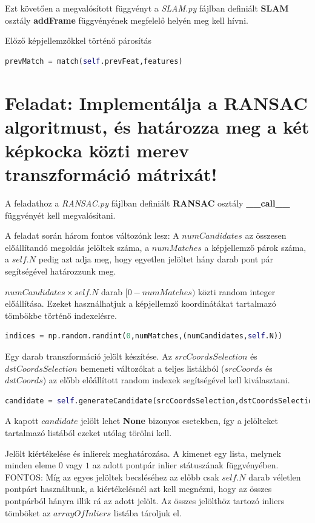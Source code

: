 \documentclass[12pt,a4paper,oneside]{report}             %
\begin{document}
Ezt követően a megvalósított függvényt a \emph{SLAM.py} fájlban definiált \textbf{SLAM} osztály \textbf{addFrame} függvényének megfelelő helyén meg kell hívni.

Előző képjellemzőkkel történő párosítás

\begin{lstlisting}[language=Python]
prevMatch = match(self.prevFeat,features)
\end{lstlisting}

\section{Feladat: Implementálja a RANSAC algoritmust, és határozza meg a két képkocka közti merev transzformáció mátrixát!}

A feladathoz a \emph{RANSAC.py} fájlban definiált \textbf{RANSAC} osztály \textbf{\_\_call\_\_} függvényét kell megvalósítani.

A feladat során három fontos változónk lesz: A $numCandidates$ az összesen előállítandó megoldás jelöltek száma, a $numMatches$ a képjellemző párok száma, a $self.N$ pedig azt adja meg, hogy egyetlen jelöltet hány darab pont pár segítségével határozzunk meg.

$numCandidates\times self.N$ darab $[0-numMatches)$ közti random integer előállítása. Ezeket használhatjuk a képjellemző koordinátákat tartalmazó tömbökbe történő indexelésre.

\begin{lstlisting}[language=Python]
indices = np.random.randint(0,numMatches,(numCandidates,self.N))
\end{lstlisting}

Egy darab transzformáció jelölt készítése. Az $srcCoordsSelection$ és $dstCoordsSelection$ bemeneti változókat a teljes listákból ($srcCoords$ és $dstCoords$) az előbb előállított random indexek segítségével kell kiválasztani.

\begin{lstlisting}[language=Python]
candidate = self.generateCandidate(srcCoordsSelection,dstCoordsSelection)
\end{lstlisting}

A kapott $candidate$ jelölt lehet \textbf{None} bizonyos esetekben, így a jelölteket tartalmazó listából ezeket utólag törölni kell.

Jelölt kiértékelése és inlierek meghatározása. A kimenet egy lista, melynek minden eleme $0$ vagy $1$ az adott pontpár inlier státuszának függvényében. FONTOS: Míg az egyes jelöltek becsléséhez az előbb csak $self.N$ darab véletlen pontpárt használtunk, a kiértékelésnél azt kell megnézni, hogy az összes pontpárból hányra illik rá az adott jelölt. Az összes jelölthöz tartozó inliers tömböket az $arrayOfInliers$ listába tároljuk el.
\end{document}
